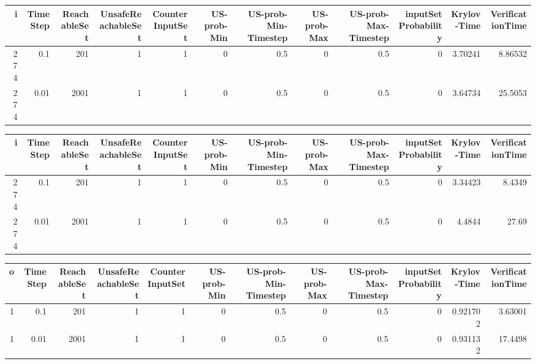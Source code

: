 \begin{tabular}{rrrrrrrrrrrr}
\hline
   i &   TimeStep &   ReachableSet &   UnsafeReachableSet &   CounterInputSet &   US-prob-Min &   US-prob-Min-Timestep &   US-prob-Max &   US-prob-Max-Timestep &   inputSet Probability &   Krylov-Time &   VerificationTime \\
\hline
 274 &       0.1  &            201 &                    1 &                 1 &             0 &                    0.5 &             0 &                    0.5 &                      0 &       3.70241 &            8.86532 \\
 274 &       0.01 &           2001 &                    1 &                 1 &             0 &                    0.5 &             0 &                    0.5 &                      0 &       3.64734 &           25.5053  \\
\hline
\end{tabular}
\begin{tabular}{rrrrrrrrrrrr}
\hline
   i &   TimeStep &   ReachableSet &   UnsafeReachableSet &   CounterInputSet &   US-prob-Min &   US-prob-Min-Timestep &   US-prob-Max &   US-prob-Max-Timestep &   inputSet Probability &   Krylov-Time &   VerificationTime \\
\hline
 274 &       0.1  &            201 &                    1 &                 1 &             0 &                    0.5 &             0 &                    0.5 &                      0 &       3.34423 &             8.4349 \\
 274 &       0.01 &           2001 &                    1 &                 1 &             0 &                    0.5 &             0 &                    0.5 &                      0 &       4.4844  &            27.69   \\
\hline
\end{tabular}
\begin{tabular}{rrrrrrrrrrrr}
\hline
   o &   TimeStep &   ReachableSet &   UnsafeReachableSet &   CounterInputSet &   US-prob-Min &   US-prob-Min-Timestep &   US-prob-Max &   US-prob-Max-Timestep &   inputSet Probability &   Krylov-Time &   VerificationTime \\
\hline
   1 &       0.1  &            201 &                    1 &                 1 &             0 &                    0.5 &             0 &                    0.5 &                      0 &      0.921702 &            3.63001 \\
   1 &       0.01 &           2001 &                    1 &                 1 &             0 &                    0.5 &             0 &                    0.5 &                      0 &      0.931132 &           17.4498  \\
\hline
\end{tabular}




